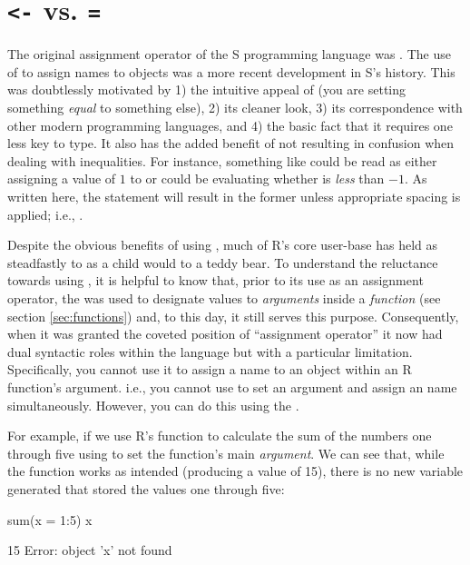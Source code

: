 \chapter{\texttt{<-} vs. \texttt{=}}
\label{sec:AppendixOperator}
The original assignment operator of the S programming language was \R{<-}. The use of \R{=} to assign names to objects was a more recent development in S's history. This was doubtlessly motivated by 1) the intuitive appeal of \R{=} (you are setting something \textit{equal} to something else), 2) its cleaner look, 3) its correspondence with other modern programming languages, and 4) the basic fact that it requires one less key to type. It also has the added benefit of not resulting in confusion when dealing with inequalities. For instance, something like  could be read as either assigning a value of $1$ to  or could be evaluating whether  is \textit{less} than $-1$.  As written here, the statement will result in the former unless appropriate spacing is applied; i.e., .  

Despite the obvious benefits of using \R{=}, much of R's core user-base has held as steadfastly to \R{<-} as a child would to a teddy bear. To understand the reluctance towards using \R{=}, it is helpful to know that, prior to its use as an assignment operator, the \R{=} was used to designate values to \textit{arguments} inside a \textit{function} (see section \ref{sec:functions}) and, to this day, it still serves this purpose. Consequently, when it was granted the coveted position of ``assignment operator'' it now had dual syntactic roles within the language but with a particular limitation.  Specifically, you cannot use it to assign a name to an object within an R function's argument. i.e., you cannot use \R{=} to set an argument and assign an name simultaneously. However, you can do this using the \R{<-}.

For example, if we use R's  function to calculate the sum of the numbers one through five using \R{=} to set the function's main \textit{argument}. We can see that, while the function works as intended (producing a value of 15), there is no new variable generated that stored the values one through five:

\begin{inR}
sum(x = 1:5)
x
\end{inR}

\begin{outR}
[1] 15
Error: object 'x' not found
\end{outR}

